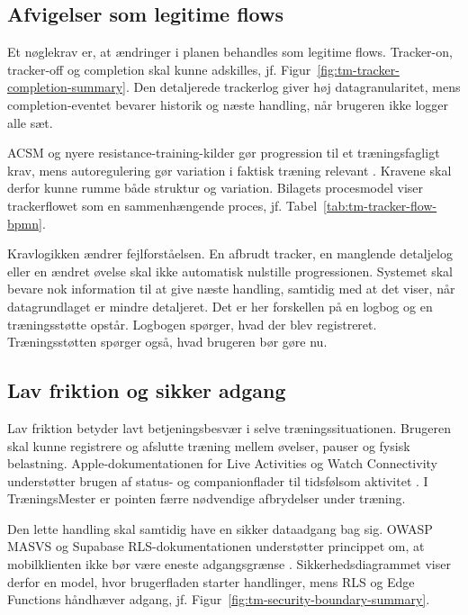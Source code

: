 \subsection{Afvigelser som legitime flows}

Et nøglekrav er, at ændringer i planen behandles som legitime flows. Tracker-on, tracker-off og completion skal kunne adskilles, jf. Figur~\ref{fig:tm-tracker-completion-summary}. Den detaljerede trackerlog giver høj datagranularitet, mens completion-eventet bevarer historik og næste handling, når brugeren ikke logger alle sæt.

ACSM og nyere resistance-training-kilder gør progression til et træningsfagligt krav, mens autoregulering gør variation i faktisk træning relevant \cite{acsm2009_progression_models,currier2026_acsm_resistance_training,greig2020_autoregulation_resistance_training}. Kravene skal derfor kunne rumme både struktur og variation. Bilagets procesmodel viser trackerflowet som en sammenhængende proces, jf. Tabel~\ref{tab:tm-tracker-flow-bpmn}.

Kravlogikken ændrer fejlforståelsen. En afbrudt tracker, en manglende detaljelog eller en ændret øvelse skal ikke automatisk nulstille progressionen. Systemet skal bevare nok information til at give næste handling, samtidig med at det viser, når datagrundlaget er mindre detaljeret. Det er her forskellen på en logbog og en træningsstøtte opstår. Logbogen spørger, hvad der blev registreret. Træningsstøtten spørger også, hvad brugeren bør gøre nu.

\subsection{Lav friktion og sikker adgang}

Lav friktion betyder lavt betjeningsbesvær i selve træningssituationen. Brugeren skal kunne registrere og afslutte træning mellem øvelser, pauser og fysisk belastning. Apple-dokumentationen for Live Activities og Watch Connectivity understøtter brugen af status- og companionflader til tidsfølsom aktivitet \cite{apple_activitykit_live_data_docs,apple_watchconnectivity_docs}. I TræningsMester er pointen færre nødvendige afbrydelser under træning.

Den lette handling skal samtidig have en sikker dataadgang bag sig. OWASP MASVS og Supabase RLS-dokumentationen understøtter princippet om, at mobilklienten ikke bør være eneste adgangsgrænse \cite{owasp2024_masvs,supabase_rls_docs,supabase_securing_api_docs}. Sikkerhedsdiagrammet viser derfor en model, hvor brugerfladen starter handlinger, mens RLS og Edge Functions håndhæver adgang, jf. Figur~\ref{fig:tm-security-boundary-summary}.

